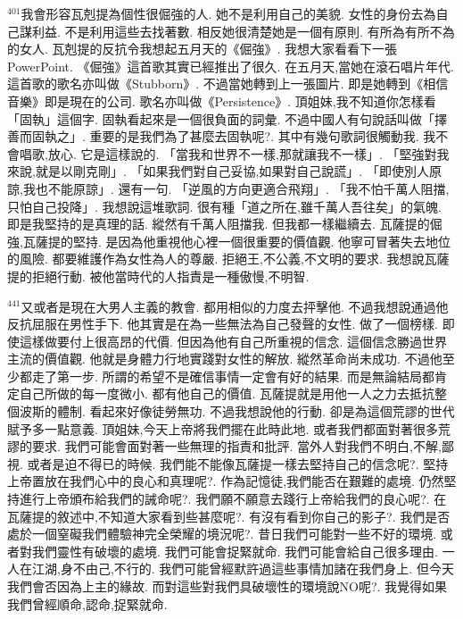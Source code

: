 \documentclass{book}
\begin{document}
$^{401}$我會形容瓦剋提為個性很倔強的人.
她不是利用自己的美貌.
女性的身份去為自己謀利益.
不是利用這些去找著數.
相反她很清楚她是一個有原則.
有所為有所不為的女人.
瓦剋提的反抗令我想起五月天的《倔強》.
我想大家看看下一張PowerPoint.
《倔強》這首歌其實已經推出了很久.
在五月天,當她在滾石唱片年代.
這首歌的歌名亦叫做《Stubborn》.
不過當她轉到上一張圖片.
即是她轉到《相信音樂》即是現在的公司.
歌名亦叫做《Persistence》.
頂姐妹,我不知道你怎樣看「固執」這個字.
固執看起來是一個很負面的詞彙.
不過中國人有句說話叫做「擇善而固執之」.
重要的是我們為了甚麼去固執呢?.
其中有幾句歌詞很觸動我.
我不會唱歌,放心.
它是這樣說的.
「當我和世界不一樣,那就讓我不一樣」.
「堅強對我來說,就是以剛克剛」.
「如果我們對自己妥協,如果對自己說謊」.
「即使別人原諒,我也不能原諒」.
還有一句.
「逆風的方向更適合飛翔」.
「我不怕千萬人阻擋,只怕自己投降」.
我想說這堆歌詞.
很有種「道之所在,雖千萬人吾往矣」的氣魄.
即是我堅持的是真理的話.
縱然有千萬人阻擋我.
但我都一樣繼續去.
瓦薩提的倔強,瓦薩提的堅持.
是因為他重視他心裡一個很重要的價值觀.
他寧可冒著失去地位的風險.
都要維護作為女性為人的尊嚴.
拒絕王,不公義,不文明的要求.
我想說瓦薩提的拒絕行動.
被他當時代的人指責是一種傲慢,不明智.

$^{441}$又或者是現在大男人主義的教會.
都用相似的力度去抨擊他.
不過我想說通過他反抗屈服在男性手下.
他其實是在為一些無法為自己發聲的女性.
做了一個榜樣.
即使這樣做要付上很高昂的代價.
但因為他有自己所重視的信念.
這個信念勝過世界主流的價值觀.
他就是身體力行地實踐對女性的解放.
縱然革命尚未成功.
不過他至少都走了第一步.
所謂的希望不是確信事情一定會有好的結果.
而是無論結局都肯定自己所做的每一度微小.
都有他自己的價值.
瓦薩提就是用他一人之力去抵抗整個波斯的體制.
看起來好像徒勞無功.
不過我想說他的行動.
卻是為這個荒謬的世代賦予多一點意義.
頂姐妹,今天上帝將我們擺在此時此地.
或者我們都面對著很多荒謬的要求.
我們可能會面對著一些無理的指責和批評.
當外人對我們不明白,不解,鄙視.
或者是迫不得已的時候.
我們能不能像瓦薩提一樣去堅持自己的信念呢?.
堅持上帝置放在我們心中的良心和真理呢?.
作為記憶徒,我們能否在艱難的處境.
仍然堅持進行上帝頒布給我們的誡命呢?.
我們願不願意去踐行上帝給我們的良心呢?.
在瓦薩提的敘述中,不知道大家看到些甚麼呢?.
有沒有看到你自己的影子?.
我們是否處於一個窒礙我們體驗神完全榮耀的境況呢?.
昔日我們可能對一些不好的環境.
或者對我們靈性有破壞的處境.
我們可能會捉緊就命.
我們可能會給自己很多理由.
一人在江湖,身不由己,不行的.
我們可能曾經默許過這些事情加諸在我們身上.
但今天我們會否因為上主的緣故.
而對這些對我們具破壞性的環境說NO呢?.
我覺得如果我們曾經順命,認命,捉緊就命.
\end{document}

